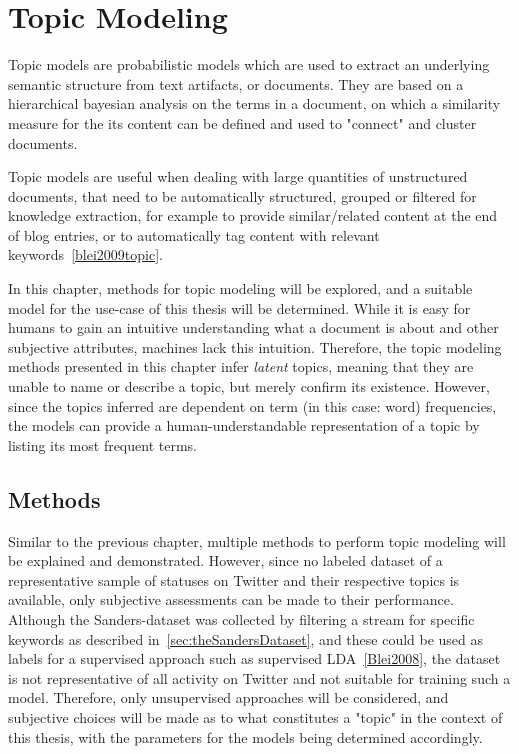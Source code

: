 \chapter{Topic Modeling}
\label{ch:topicModeling}

Topic models are probabilistic models which are used to extract an underlying semantic structure from text artifacts, or documents.
They are based on a hierarchical bayesian analysis on the terms in a document,
on which a similarity measure for the its content can be defined and used to "connect" and cluster documents.
\par
Topic models are useful when dealing with large quantities of unstructured documents,
that need to be automatically structured, grouped or filtered for knowledge extraction,
for example to provide similar/related content at the end of blog entries,
or to automatically tag content with relevant keywords~\ref{blei2009topic}.
\par
In this chapter, methods for topic modeling will be explored,
and a suitable model for the use-case of this thesis will be determined.
While it is easy for humans to gain an intuitive understanding what a document is about
and other subjective attributes, machines lack this intuition.
Therefore, the topic modeling methods presented in this chapter infer \textit{latent} topics,
meaning that they are unable to name or describe a topic, but merely confirm its existence.
However, since the topics inferred are dependent on term (in this case: word) frequencies,
the models can provide a human-understandable representation of a topic by listing its most frequent terms.

\section{Methods}
\label{sec:methods_topicmodeling}

Similar to the previous chapter, multiple methods to perform topic modeling will be explained and demonstrated.
However, since no labeled dataset of a representative sample of statuses on Twitter and their respective topics is available,
only subjective assessments can be made to their performance.
Although the Sanders-dataset was collected by filtering a stream for specific keywords as described in~\ref{sec:theSandersDataset},
and these could be used as labels for a supervised approach such as supervised LDA~\ref{Blei2008},
the dataset is not representative of all activity on Twitter and not suitable for training such a model.
Therefore, only unsupervised approaches will be considered,
and subjective choices will be made as to what constitutes a "topic" in the context of this thesis,
with the parameters for the models being determined accordingly.

